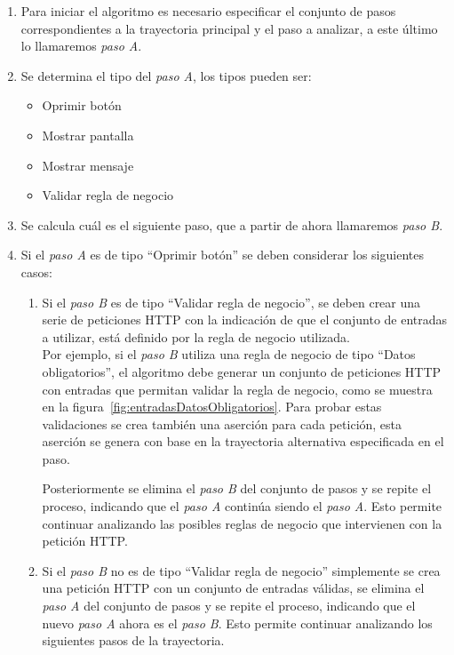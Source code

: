 	\begin{enumerate}
		\item Para iniciar el algoritmo es necesario especificar el conjunto de pasos correspondientes a la trayectoria principal y el paso a analizar, a este último lo llamaremos {\it paso A}.
		\item Se determina el tipo del {\it paso A}, los tipos pueden ser:
		\begin{itemize}
			\item Oprimir botón
			\item Mostrar pantalla
			\item Mostrar mensaje
			\item Validar regla de negocio
		\end{itemize}
		
		\item Se calcula cuál es el siguiente paso, que a partir de ahora llamaremos {\it paso B}.
		
		\item Si el {\it paso A} es de tipo ``Oprimir botón'' se deben considerar los siguientes casos:
		
		\begin{enumerate}
			\item Si el {\it paso B} es de tipo ``Validar regla de negocio'', se deben crear una serie de peticiones HTTP con la indicación de que el conjunto de entradas a utilizar, está definido por la regla de negocio utilizada.\\
			 Por ejemplo, si el {\it paso B} utiliza una regla de negocio de tipo ``Datos obligatorios'', el algoritmo debe generar un conjunto de peticiones HTTP con entradas que permitan validar la regla de negocio, como se muestra en la figura~\ref{fig:entradasDatosObligatorios}. Para probar estas validaciones se crea también una aserción para cada petición, esta aserción se genera con base en la trayectoria alternativa especificada en el paso.
			
			
			Posteriormente se elimina el {\it paso B} del conjunto de pasos y se repite el proceso, indicando que el {\it paso A} continúa siendo el {\it paso A}. Esto permite continuar analizando las posibles reglas de negocio que intervienen con la petición HTTP.\\
						
			
			\item Si el {\it paso B} no es de tipo ``Validar regla de negocio'' simplemente se crea una petición HTTP con un conjunto de entradas válidas, se elimina el {\it paso A} del conjunto de pasos y se repite el proceso, indicando que el nuevo {\it paso A} ahora es el {\it paso B}. Esto permite continuar analizando los siguientes pasos de la trayectoria.
			

\end{enumerate}
\end{enumerate}
